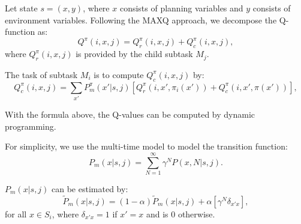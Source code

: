 Let state $s = (x, y)$, where $x$ consists of planning variables and $y$ consists of environment
variables. Following the MAXQ approach, we decompose the Q-function as:
\begin{equation}
    Q^{\pi}(i, x, j) = Q_r^{\pi}(i, x, j) + Q_c^{\pi}(i, x, j),
    \label{eq:biasedMaxQ}
\end{equation}
where $Q_r^{\pi}(i, x, j)$ is provided by the child subtask $M_j$.

The task of subtask $M_i$ is to compute $Q_c^{\pi}(i, x, j)$ by:
\begin{equation}
    Q_c^{\pi}(i, x, j) = \sum_{x'} P_m^{\pi}(x'|s, j)[Q_r^{\pi}(i, x', \pi_i(x')) + Q_c^{\pi}(i, x', \pi(x'))],
    \label{eq:biasedQc}
\end{equation}

With the formula above, the Q-values can be computed by dynamic programming.

For simplicity, we use the multi-time model \cite{SMDP} to model the transition function: 
\begin{equation}
    P_m(x|s, j) = \sum^{\infty}_{N=1} \gamma^N P(x, N|s, j).
    \label{eq:multiProb}
\end{equation}

$P_m(x|s, j)$ can be estimated by:
\begin{equation}
    \tilde{P}_m(x|s, j) = (1-\alpha)\tilde{P}_m(x|s, j) + \alpha [ \gamma^N \delta_{x'x}],
    \label{eq:approxP}
\end{equation}
for all $x \in S_i$, where $\delta_{x'x}=1$ if $x' = x$ and is 0 otherwise.

